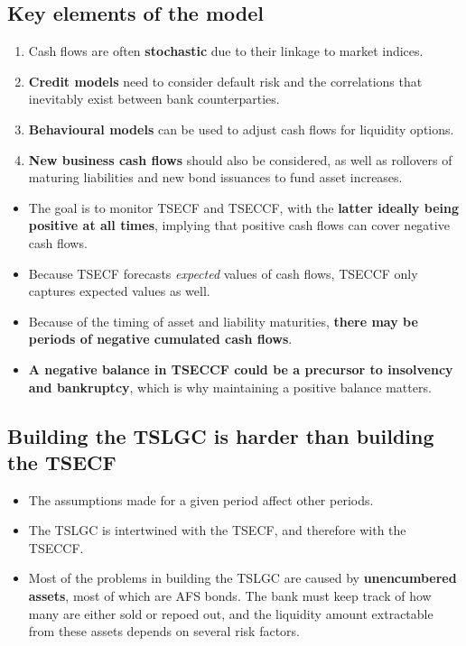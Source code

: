 \subsection{Key elements of the model}

\begin{enumerate}
\item Cash flows are often \textbf{stochastic} due to their linkage to market indices.
\item \textbf{Credit models} need to consider default risk and the correlations that inevitably exist between bank counterparties.
\item \textbf{Behavioural models} can be used to adjust cash flows for liquidity options.
\item \textbf{New business cash flows} should also be considered, as well as rollovers of maturing liabilities and new bond issuances to fund asset increases.
\end{enumerate}

\begin{lrkeybox}
\begin{itemize}
\item The goal is to monitor TSECF and TSECCF, with the \textbf{latter ideally being positive at all times}, implying that positive cash flows can cover negative cash flows.
\item Because TSECF forecasts \emph{expected} values of cash flows, TSECCF only captures expected values as well.
\item Because of the timing of asset and liability maturities, \textbf{there may be periods of negative cumulated cash flows}.
\item \textbf{A negative balance in TSECCF could be a precursor to insolvency and bankruptcy}, which is why maintaining a positive balance matters.
\end{itemize}
\end{lrkeybox}

\subsection{Building the TSLGC is harder than building the TSECF}

\begin{itemize}
\item The assumptions made for a given period affect other periods.
\item The TSLGC is intertwined with the TSECF, and therefore with the TSECCF.
\item Most of the problems in building the TSLGC are caused by \textbf{unencumbered assets}, most of which are AFS bonds. The bank must keep track of how many are either sold or repoed out, and the liquidity amount extractable from these assets depends on several risk factors.
\end{itemize}

